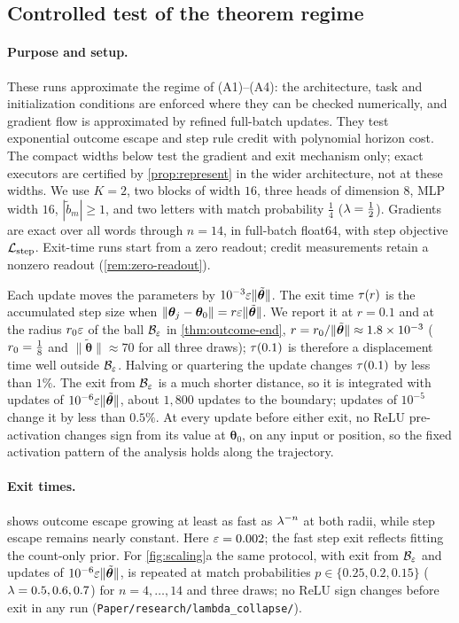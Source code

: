 \subsection{Controlled test of the theorem regime}
\label{app:exp-regime}
\label{app:regime}
\paragraph{Purpose and setup.} These runs approximate the regime of (A1)--(A4): the architecture, task and initialization conditions are enforced where
they can be checked numerically, and gradient flow is approximated by refined full-batch updates. They test exponential outcome
escape and step rule credit with polynomial horizon cost. The compact widths below test the gradient and exit mechanism only;
exact executors are certified by \cref{prop:represent} in the wider architecture, not at these widths.
We use $K=2$, two blocks of width $16$, three heads of dimension $8$, MLP width $16$, $|\tilde b_m|\ge1$,
and two letters with match probability $\tfrac{1}{4}$ ($\mixrate=\tfrac{1}{2}$). Gradients are exact over all words through $n=14$,
in full-batch float64, with step objective $\mathcal L_{\mathrm{step}}$. Exit-time runs start from a zero readout; credit measurements retain a
nonzero readout (\cref{rem:zero-readout}).

Each update moves the parameters by $10^{-3}\varepsilon\|\tilde{\bm\theta}\|$.
The exit time $\tau(r)$ is the accumulated step size when $\|\bm\theta_j-\bm\theta_0\|=r\varepsilon\|\tilde{\bm\theta}\|$. We report it at
$r=0.1$ and at the radius $r_0\varepsilon$ of the ball $\mathcal B_{\varepsilon}$ in \cref{thm:outcome-end}, $r=r_0/\|\tilde{\bm\theta}\|\approx1.8\times10^{-3}$
($\ballradius=\tfrac{1}{8}$ and $\|\tilde{\bm\theta}\|\approx70$ for all three draws); $\tau(0.1)$ is therefore a displacement time well outside $\mathcal B_{\varepsilon}$.
Halving or quartering the update changes $\tau(0.1)$ by less than $1\%$. The exit from $\mathcal B_{\varepsilon}$ is a much shorter distance, so
it is integrated with updates of $10^{-6}\varepsilon\|\tilde{\bm\theta}\|$, about $1{,}800$ updates to the boundary; updates of $10^{-5}$ change it by
less than $0.5\%$. At every update before either exit, no ReLU pre-activation
changes sign from its value at $\bm\theta_0$, on any input or position, so the fixed activation pattern of the analysis holds along the trajectory.

\paragraph{Exit times.}  shows outcome escape growing at least as fast as
$\lambda^{-n}$ at both radii, while step escape remains nearly constant. Here $\varepsilon=0.002$; the fast step exit reflects fitting the
count-only prior. For \cref{fig:scaling}a the same protocol, with exit from $\mathcal B_{\varepsilon}$ and updates of $10^{-6}\varepsilon\|\tilde{\bm\theta}\|$, is
repeated at match probabilities $p\in\{0.25,0.2,0.15\}$ ($\lambda=0.5,0.6,0.7$) for $n=4,\ldots,14$ and three draws; no ReLU sign changes
before exit in any run (\texttt{Paper/research/lambda\_collapse/}).

